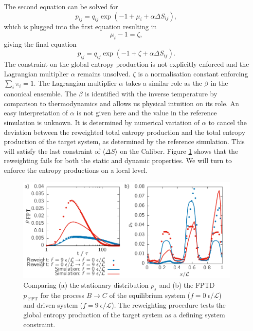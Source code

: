 The second equation can be solved for 
\begin{equation}
 p_{ij} = q_{ij} \exp \left (-1+ \mu_i + \alpha \Delta S_{ij} \right ),
\end{equation}
which is plugged into the first equation resulting in
\begin{equation}
 \mu_i -1 = \zeta,
 \end{equation}
giving the final equation 
\begin{equation}
 p_{ij} = q_{ij} \exp \left (-1+ \zeta + \alpha \Delta S_{ij} \right ).
\end{equation}
The constraint on the global entropy production is not explicitly enforced and the Lagrangian multiplier $\alpha$ remains unsolved. $\zeta$ is a normalisation constant enforcing $\sum_i \pi_i = 1$. The Lagrangian multiplier $\alpha$ takes a similar role as the $\beta$ in the canonical ensemble. The $\beta$ is identified with the inverse temperature by comparison to thermodynamics and allows us physical intuition on its role. An easy interpretation of $\alpha$ is not given here and the value in the reference simulation is unknown. It is determined by numerical variation of $\alpha$ to cancel the deviation between the reweighted total entropy production and the total entropy production of the target system, as determined by the reference simulation. This will satisfy the last constraint of $\langle \Delta S \rangle$ on the Caliber.  
Figure \ref{fig:rewtrial1} shows that the reweighting fails for both the static and dynamic properties. 
We will turn to enforce the entropy productions on a local level.
\begin{figure}[t]
 \centering
 \includegraphics{../plots/Jaynes/fpt_J_2010_2910.pdf}
 \caption[Stationary distribution and first-passage time distribution for the driven 1D system reweighted with respect to global entropy production.]{Comparing (a) the stationary distribution $p_s$ and (b) the FPTD $p_{\; \text{FPT}}$ for the process $B \rightarrow C$ of the equilibrium system ($f=0~\epsilon / \mathcal{L}$) and driven system ($f=9~\epsilon / \mathcal{L}$). The reweighting procedure tests the global entropy production of the target system as a defining system constraint.}
 \label{fig:rewtrial1}
\end{figure}
